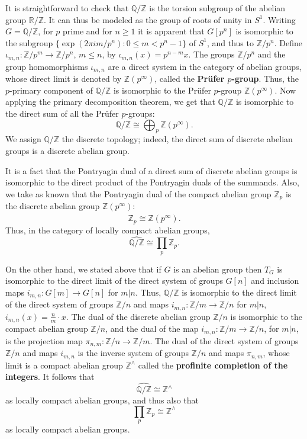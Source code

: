 \documentclass{article}
\theoremstyle{definition}
\theoremstyle{definition}
\begin{document}
It is straightforward to check that 
$\mathbb{Q}/\mathbb{Z}$ is the torsion subgroup of the abelian group $\mathbb{R}/\mathbb{Z}$. It can thus be modeled as the
group of roots of unity in $S^1$. Writing $G=\mathbb{Q}/\mathbb{Z}$, for $p$ prime and for $n \geq 1$
it is apparent that $G[p^n]$ is isomorphic to the subgroup $\{\exp(2\pi i m/p^n): 0\leq m < p^n-1\}$ of $S^1$, and thus to
$\mathbb{Z}/p^n$. Define $\iota_{m,n}:\mathbb{Z}/p^m \to \mathbb{Z}/p^n$, $m \leq n$, by $\iota_{m,n}(x)=p^{n-m}x$. The groups
$\mathbb{Z}/p^n$ and the group homomorphisms $\iota_{m,n}$ are a direct system in the category of abelian groups,
whose direct limit is denoted by $\mathbb{Z}(p^\infty)$, called the \textbf{Pr\"ufer $p$-group}.
Thus,  the
$p$-primary component of $\mathbb{Q}/\mathbb{Z}$ is isomorphic to the Pr\"ufer $p$-group 
$\mathbb{Z}(p^\infty)$. 
Now applying the primary decomposition theorem, we get that $\mathbb{Q}/\mathbb{Z}$ is isomorphic to the direct sum of all the  Pr\"ufer $p$-groups:
\begin{equation}
\mathbb{Q}/\mathbb{Z} \cong \bigoplus_p \mathbb{Z}(p^\infty).
\label{QmodZ}
\end{equation}
We assign $\mathbb{Q}/\mathbb{Z}$ the discrete topology; indeed, the direct sum of discrete abelian groups
is a discrete abelian group.

It is a fact that the Pontryagin dual of a direct sum of discrete abelian groups is isomorphic
to the direct product of the Pontryagin duals of the summands. Also, we take as known that
the Pontryagin dual of
the compact abelian group $\mathbb{Z}_p$ is the discrete abelian group $\mathbb{Z}(p^\infty)$:
\[
\widehat{\mathbb{Z}_p} \cong \mathbb{Z}(p^\infty).
\]
Thus, in the category of locally compact abelian groups,
\[
\widehat{\mathbb{Q}/\mathbb{Z}} \cong \prod_p \mathbb{Z}_p.
\]

On the other hand, we stated above that if $G$ is an abelian group then $T_G$ is isomorphic to the direct limit
of the direct system of groups $G[n]$ and inclusion maps $i_{m,n}:G[m] \to G[n]$ for $m|n$. Thus, 
$\mathbb{Q}/\mathbb{Z}$ is isomorphic to the direct limit of the direct system of groups $\mathbb{Z}/n$ and  
maps $i_{m,n}:\mathbb{Z}/m \to \mathbb{Z}/n$ for $m|n$, $i_{m,n}(x)=\frac{n}{m}\cdot x$. The dual of the discrete abelian group $\mathbb{Z}/n$ is isomorphic
to the compact abelian group $\mathbb{Z}/n$, and the dual of the  map $i_{m,n}:\mathbb{Z}/m \to \mathbb{Z}/n$, for
$m|n$, is the 
projection map $\pi_{n,m}:\mathbb{Z}/n \to \mathbb{Z}/m$. The dual of the direct system 
of groups $\mathbb{Z}/n$ and maps $i_{m,n}$ is the inverse system of groups $\mathbb{Z}/n$ and maps
$\pi_{n,m}$, whose limit is a compact abelian group $\mathbb{Z}^\wedge$ called the \textbf{profinite completion of the integers}. It follows that
\[
\widehat{\mathbb{Q}/\mathbb{Z}} \cong \mathbb{Z}^\wedge
\]
as locally compact abelian groups, and thus also that
\[
\prod_p \mathbb{Z}_p \cong \mathbb{Z}^\wedge
\]
as locally compact abelian groups.
\end{document}
